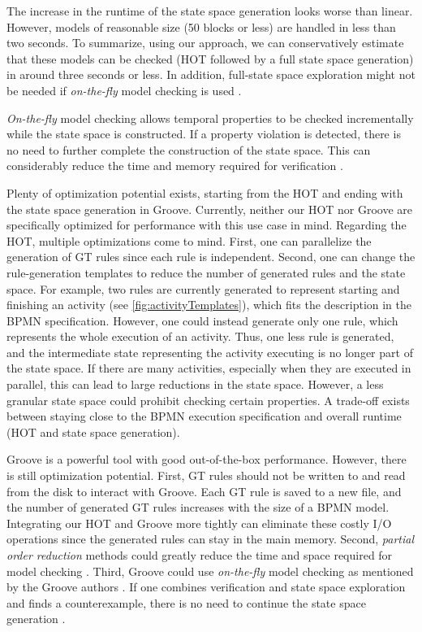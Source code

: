 \documentclass{lmcs} %
\begin{document}
The increase in the runtime of the state space generation looks worse than linear.
However, models of reasonable size (50 blocks or less) are handled in less than two seconds.
To summarize, using our approach, we can conservatively estimate that these models can be checked (HOT followed by a full state space generation) in around three seconds or less.
In addition, full-state space exploration might not be needed if \textit{on-the-fly} model checking is used \cite{clarkeHandbookModelChecking2018}.

\textit{On-the-fly} model checking allows temporal properties to be checked incrementally while the state space is constructed.
If a property violation is detected, there is no need to further complete the construction of the state space.
This can considerably reduce the time and memory required for verification \cite{clarkeHandbookModelChecking2018}.

Plenty of optimization potential exists, starting from the HOT and ending with the state space generation in Groove.
Currently, neither our HOT nor Groove are specifically optimized for performance with this use case in mind.
Regarding the HOT, multiple optimizations come to mind.
First, one can parallelize the generation of GT rules since each rule is independent.
Second, one can change the rule-generation templates to reduce the number of generated rules and the state space.
For example, two rules are currently generated to represent starting and finishing an activity (see \autoref{fig:activityTemplates}), which fits the description in the BPMN specification.
However, one could instead generate only one rule, which represents the whole execution of an activity.
Thus, one less rule is generated, and the intermediate state representing the activity executing is no longer part of the state space.
If there are many activities, especially when they are executed in parallel, this can lead to large reductions in the state space.
However, a less granular state space could prohibit checking certain properties.
A trade-off exists between staying close to the BPMN execution specification and overall runtime (HOT and state space generation).

Groove is a powerful tool with good out-of-the-box performance.
However, there is still optimization potential.
First, GT rules should not be written to and read from the disk to interact with Groove.
Each GT rule is saved to a new file, and the number of generated GT rules increases with the size of a BPMN model.
Integrating our HOT and Groove more tightly can eliminate these costly I/O operations since the generated rules can stay in the main memory.
Second, \textit{partial order reduction} methods could greatly reduce the time and space required for model checking \cite{clarkeHandbookModelChecking2018}.
Third, Groove could use \textit{on-the-fly} model checking as mentioned by the Groove authors \cite{kastenbergModelCheckingDynamic2006}.
If one combines verification and state space exploration and finds a counterexample, there is no need to continue the state space generation \cite{kastenbergModelCheckingDynamic2006,clarkeHandbookModelChecking2018}.
\end{document}
